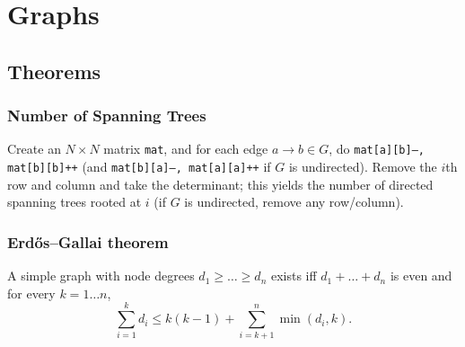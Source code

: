 \chapter{Graphs}

\section{Theorems}

\subsection{Number of Spanning Trees}
		Create an $N\times N$ matrix \texttt{mat}, and for each edge $a \rightarrow b \in G$, do
		\texttt{mat[a][b]--, mat[b][b]++} (and \texttt{mat[b][a]--, mat[a][a]++} if $G$ is undirected).
		Remove the $i$th row and column and take the determinant; this yields the number of directed spanning trees rooted at $i$
		(if $G$ is undirected, remove any row/column).

	\subsection{Erdős–Gallai theorem}
		A simple graph with node degrees $d_1 \ge \dots \ge d_n$ exists iff $d_1 + \dots + d_n$ is even and for every $k = 1\dots n$,
		\[ \sum _{i=1}^{k}d_{i}\leq k(k-1)+\sum _{i=k+1}^{n}\min(d_{i},k). \]

